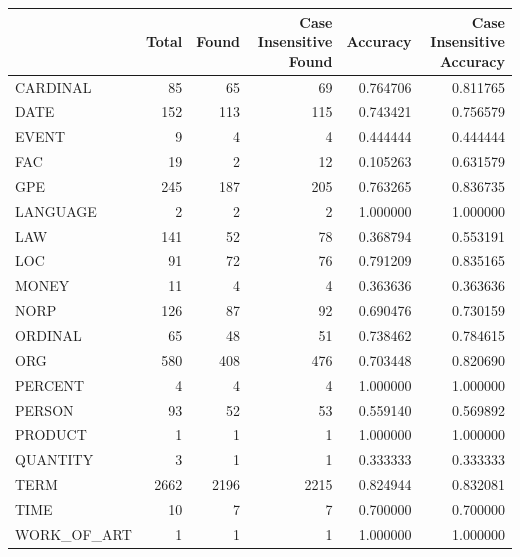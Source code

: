 \begin{tabular}{lrrrrr}
\toprule
 & Total & Found & Case Insensitive Found & Accuracy & Case Insensitive Accuracy \\
\midrule
CARDINAL & 85 & 65 & 69 & 0.764706 & 0.811765 \\
DATE & 152 & 113 & 115 & 0.743421 & 0.756579 \\
EVENT & 9 & 4 & 4 & 0.444444 & 0.444444 \\
FAC & 19 & 2 & 12 & 0.105263 & 0.631579 \\
GPE & 245 & 187 & 205 & 0.763265 & 0.836735 \\
LANGUAGE & 2 & 2 & 2 & 1.000000 & 1.000000 \\
LAW & 141 & 52 & 78 & 0.368794 & 0.553191 \\
LOC & 91 & 72 & 76 & 0.791209 & 0.835165 \\
MONEY & 11 & 4 & 4 & 0.363636 & 0.363636 \\
NORP & 126 & 87 & 92 & 0.690476 & 0.730159 \\
ORDINAL & 65 & 48 & 51 & 0.738462 & 0.784615 \\
ORG & 580 & 408 & 476 & 0.703448 & 0.820690 \\
PERCENT & 4 & 4 & 4 & 1.000000 & 1.000000 \\
PERSON & 93 & 52 & 53 & 0.559140 & 0.569892 \\
PRODUCT & 1 & 1 & 1 & 1.000000 & 1.000000 \\
QUANTITY & 3 & 1 & 1 & 0.333333 & 0.333333 \\
TERM & 2662 & 2196 & 2215 & 0.824944 & 0.832081 \\
TIME & 10 & 7 & 7 & 0.700000 & 0.700000 \\
WORK_OF_ART & 1 & 1 & 1 & 1.000000 & 1.000000 \\
\bottomrule
\end{tabular}

